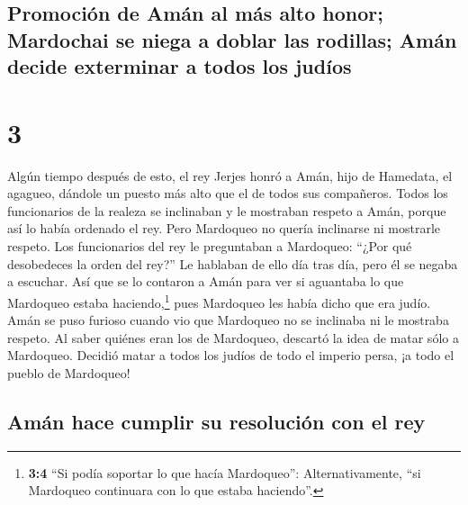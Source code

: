 \hypertarget{promociuxf3n-de-amuxe1n-al-muxe1s-alto-honor-mardochai-se-niega-a-doblar-las-rodillas-amuxe1n-decide-exterminar-a-todos-los-juduxedos}{%
\subsection{Promoción de Amán al más alto honor; Mardochai se niega a
doblar las rodillas; Amán decide exterminar a todos los
judíos}\label{promociuxf3n-de-amuxe1n-al-muxe1s-alto-honor-mardochai-se-niega-a-doblar-las-rodillas-amuxe1n-decide-exterminar-a-todos-los-juduxedos}}

\hypertarget{section-2}{%
\section{3}\label{section-2}}

 Algún tiempo después de esto, el rey Jerjes honró a Amán,
hijo de Hamedata, el agagueo, dándole un puesto más alto que el de todos
sus compañeros.  Todos los funcionarios de la realeza se
inclinaban y le mostraban respeto a Amán, porque así lo había ordenado
el rey. Pero Mardoqueo no quería inclinarse ni mostrarle respeto.
 Los funcionarios del rey le preguntaban a Mardoqueo:
``¿Por qué desobedeces la orden del rey?''  Le hablaban de
ello día tras día, pero él se negaba a escuchar. Así que se lo contaron
a Amán para ver si aguantaba lo que Mardoqueo estaba
haciendo,\footnote{\textbf{3:4} ``Si podía soportar lo que hacía
  Mardoqueo'': Alternativamente, ``si Mardoqueo continuara con lo que
  estaba haciendo''.} pues Mardoqueo les había dicho que era judío.
 Amán se puso furioso cuando vio que Mardoqueo no se
inclinaba ni le mostraba respeto.  Al saber quiénes eran
los de Mardoqueo, descartó la idea de matar sólo a Mardoqueo. Decidió
matar a todos los judíos de todo el imperio persa, ¡a todo el pueblo de
Mardoqueo!

\hypertarget{amuxe1n-hace-cumplir-su-resoluciuxf3n-con-el-rey}{%
\subsection{Amán hace cumplir su resolución con el
rey}\label{amuxe1n-hace-cumplir-su-resoluciuxf3n-con-el-rey}}

